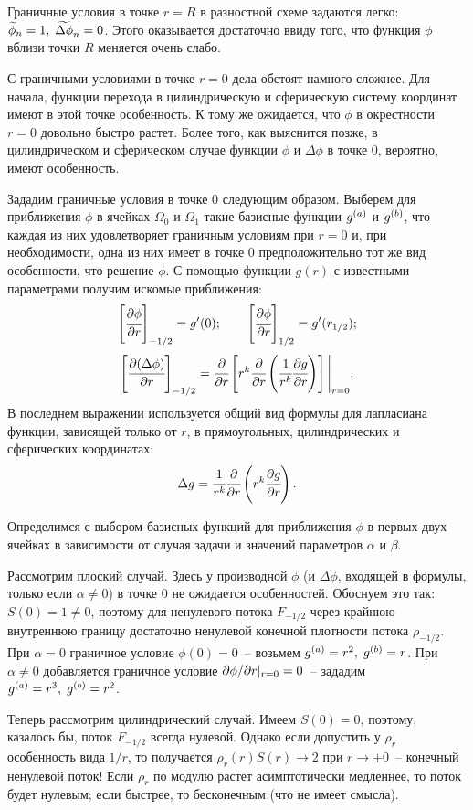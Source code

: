 Граничные условия в точке $r = R$ в разностной схеме задаются легко: ${\widetilde{\phi}}_n = 1, \; {\widetilde{\Delta \phi}}_n = 0$. Этого оказывается достаточно ввиду того, что функция $\phi$ вблизи точки $R$ меняется очень слабо.

С граничными условиями в точке $r = 0$ дела обстоят намного сложнее. Для начала, функции перехода в цилиндрическую и сферическую систему координат имеют в этой точке особенность. К тому же ожидается, что $\phi$ в окрестности $r = 0$ довольно быстро растет. Более того, как выяснится позже, в цилиндрическом и сферическом случае функции $\phi$ и $\Delta \phi$ в точке $0$, вероятно, имеют особенность.

Зададим граничные условия в точке $0$ следующим образом. Выберем для приближения $\phi$ в ячейках $\Omega_0$ и $\Omega_1$ такие базисные функции ${g^{(a)}}$ и ${g^{(b)}}$, что каждая из них удовлетворяет граничным условиям при $r = 0$ и, при необходимости, одна из них имеет в точке $0$ предположительно тот же вид особенности, что решение $\phi$. С помощью функции $g(r)$ с известными параметрами получим искомые приближения:
$${\left[ \cfrac{\partial \phi}{\partial r} \right]}_{-1/2} = g'(0); \qquad {\left[ \cfrac{\partial \phi}{\partial r} \right]}_{1/2} = g'(r_{1/2}) {\text{;}}$$
$${\left[ \cfrac{\partial (\Delta \phi)}{\partial r} \right]}_{-1/2} = \cfrac{\partial }{\partial r} \left[ r^k \cfrac{\partial }{\partial r} \left(\cfrac{1}{r^k} \cfrac{\partial g}{\partial r} \right) \right] \Bigg|_{r = 0} {\text{.}}$$
В последнем выражении используется общий вид формулы для лапласиана функции, зависящей только от $r$, в прямоугольных, цилиндрических и сферических координатах:
\begin{equation}
	\Delta g = \cfrac{1}{r^k} \cfrac{\partial }{\partial r} \left( r^k \cfrac{\partial g}{\partial r} \right) {\text{.}}
	\label{eq:laplasian_common}
\end{equation}

Определимся с выбором базисных функций для приближения $\phi$ в первых двух ячейках в зависимости от случая задачи и значений параметров $\alpha$ и $\beta$.

Рассмотрим плоский случай. Здесь у производной $\phi$ (и $\Delta \phi$, входящей в формулы, только если $\alpha \neq 0$) в точке $0$ не ожидается особенностей. Обоснуем это так: $S(0) = 1 \neq 0$, поэтому для ненулевого потока $F_{-1/2}$ через крайнюю внутреннюю границу достаточно ненулевой конечной плотности потока $\rho_{-1/2}$. При $\alpha = 0$ граничное условие $\phi(0) = 0$~-- возьмем ${g^{(a)}} = r^2, \; {g^{(b)}} = r$. При~$\alpha \neq 0$ добавляется граничное условие $\partial \phi / \partial r |_{r = 0} = 0$~-- зададим ${g^{(a)}} = r^3, \; {g^{(b)}} = r^2$.

Теперь рассмотрим цилиндрический случай. Имеем $S(0) = 0$, поэтому, казалось бы, поток $F_{-1/2}$ всегда нулевой. Однако если допустить у $\rho_r$ особенность вида $1/r$, то получается $\rho_r(r) S(r) \to 2$ при $r \to +0$~-- конечный ненулевой поток! Если $\rho_r$ по модулю растет асимптотически медленнее, то поток будет нулевым; если быстрее, то бесконечным (что не имеет смысла).

